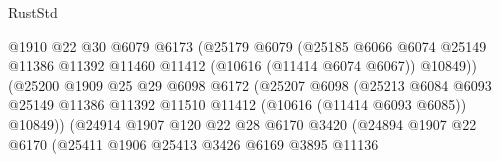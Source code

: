 \begin{lexlean}{RustStd}
\begin{coremodule}
                                      @1910
                                      @22
                                      @30
                                      @6079
                                      @6173
                                      (@25179
                                        @6079
                                        (@25185
                                          @6066
                                          @6074
                                          @25149
                                          @11386
                                          @11392
                                          @11460
                                          @11412
                                          (@10616 (@11414 @6074 @6067))
                                          @10849))
                                      (@25200
                                        @1909
                                        @25
                                        @29
                                        @6098
                                        @6172
                                        (@25207
                                          @6098
                                          (@25213
                                            @6084
                                            @6093
                                            @25149
                                            @11386
                                            @11392
                                            @11510
                                            @11412
                                            (@10616 (@11414 @6093 @6085))
                                            @10849))
                                        (@24914
                                          @1907
                                          @120
                                          @22
                                          @28
                                          @6170
                                          @3420
                                          (@24894
                                            @1907
                                            @22
                                            @6170
                                            (@25411
                                              @1906
                                              @25413
                                              @3426
                                              @6169
                                              @3895
                                              @11136

\end{coremodule}
\end{lexlean}
